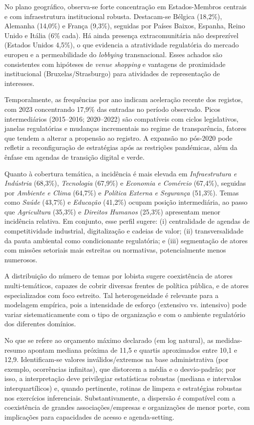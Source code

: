 No plano geográfico, observa-se forte concentração em Estados-Membros centrais e com infraestrutura institucional robusta. Destacam-se Bélgica (18,2\%), Alemanha (14,0\%) e França (9,3\%), seguidas por Países Baixos, Espanha, Reino Unido e Itália (6\% cada). Há ainda presença extracomunitária não desprezível (Estados Unidos 4,5\%), o que evidencia a atratividade regulatória do mercado europeu e a permeabilidade do \textit{lobbying} transnacional. Esses achados são consistentes com hipóteses de \textit{venue shopping} e vantagens de proximidade institucional (Bruxelas/Strasburgo) para atividades de representação de interesses.

Temporalmente, as frequências por ano indicam aceleração recente dos registos, com 2023 concentrando 17,9\% das entradas no período observado. Picos intermediários (2015--2016; 2020--2022) são compatíveis com ciclos legislativos, janelas regulatórias e mudanças incrementais no regime de transparência, fatores que tendem a alterar a propensão ao registro. A expansão no pós-2020 pode refletir a reconfiguração de estratégias após as restrições pandémicas, além da ênfase em agendas de transição digital e verde.

Quanto à cobertura temática, a incidência é mais elevada em \textit{Infraestrutura e Indústria} (68,3\%), \textit{Tecnologia} (67,9\%) e \textit{Economia e Comércio} (67,4\%), seguidas por \textit{Ambiente e Clima} (64,7\%) e \textit{Política Externa e Segurança} (51,3\%). Temas como \textit{Saúde} (43,7\%) e \textit{Educação} (41,2\%) ocupam posição intermediária, ao passo que \textit{Agricultura} (35,3\%) e \textit{Direitos Humanos} (25,3\%) apresentam menor incidência relativa. Em conjunto, esse perfil sugere: (i) centralidade de agendas de competitividade industrial, digitalização e cadeias de valor; (ii) transversalidade da pauta ambiental como condicionante regulatória; e (iii) segmentação de atores com missões setoriais mais estreitas ou normativas, potencialmente menos numerosos.

A distribuição do número de temas por lobista sugere coexistência de atores multi-temáticos, capazes de cobrir diversas frentes de política pública, e de atores especializados com foco estreito. Tal heterogeneidade é relevante para a modelagem empírica, pois a intensidade de esforço (extensivo vs. intensivo) pode variar sistematicamente com o tipo de organização e com o ambiente regulatório dos diferentes domínios.

No que se refere ao orçamento máximo declarado (em log natural), as medidas-resumo apontam mediana próxima de 11,5 e quartis aproximados entre 10,1 e 12,9. Identificam-se valores inválidos/extremos na base administrativa (por exemplo, ocorrências infinitas), que distorcem a média e o desvio-padrão; por isso, a interpretação deve privilegiar estatísticas robustas (mediana e intervalos interquartílicos) e, quando pertinente, rotinas de limpeza e estratégias robustas nos exercícios inferenciais. Substantivamente, a dispersão é compatível com a coexistência de grandes associações/empresas e organizações de menor porte, com implicações para capacidades de acesso e agenda-setting.

